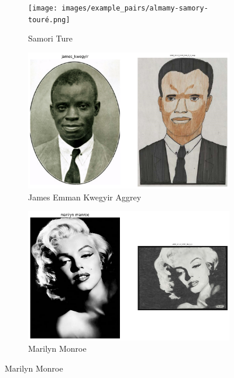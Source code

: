  \begin{figure}
     \centering
     \begin{subfigure}[b]{0.45\textwidth}
         \centering
         \texttt{[image: images/example\_pairs/almamy-samory-touré.png]}
         \caption{Samori Ture}
     \end{subfigure}
     \hfil
     \begin{subfigure}[b]{0.45\textwidth}
         \centering
         \includegraphics[width=\textwidth]{images/example_pairs/james_kwegyir.png}
         \caption{James Emman Kwegyir Aggrey}
     \end{subfigure}
     \hfil
     \begin{subfigure}[b]{0.45\textwidth}
         \centering
         \includegraphics[width=\textwidth]{images/example_pairs/marilyn-manroe.png}
         \caption{Marilyn Monroe}
     \end{subfigure}
     \hfil

\end{figure}
